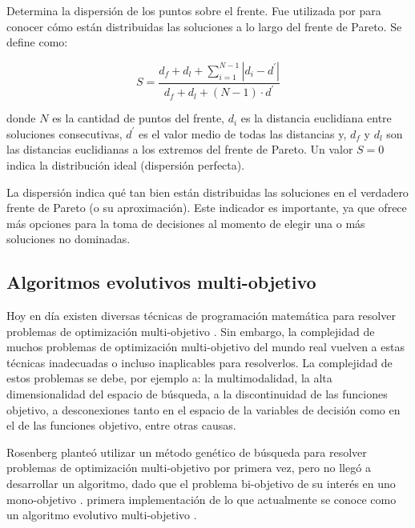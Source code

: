       \DIFdelbegin %
\DIFdelend \DIFaddbegin \begin{definicion}
	 \DIFaddend Determina la dispersi\'on de los puntos sobre el frente. Fue utilizada por \cite{deb02} para conocer 
	 c\'omo est\'an distribuidas las soluciones a lo largo del frente de Pareto. Se define como:

	 \[S= \frac{d_f + d_l + \sum^{N-1}_{i=1}{|d_i-d^{'}|}}{d_f + d_l + \left(N -1\right)\cdot d^{'}}\]

      donde $N$ es la cantidad de puntos del frente, $d_i$ es la distancia euclidiana entre soluciones consecutivas, 
      $d^{'}$ es el valor medio de todas las distancias y, $d_f$ y $d_l$ son las distancias euclidianas a los extremos 
      del frente de Pareto. Un valor $S = 0$ indica la distribuci\'on ideal (dispersi\'on perfecta).
      \end{definicion}   

      La dispersi\'on indica qu\'e tan bien est\'an distribuidas las soluciones en el verdadero frente de Pareto (o su aproximaci\'on).
      Este indicador es importante, ya que ofrece m\'as opciones para la toma de decisiones al momento de elegir una o m\'as soluciones 
      no dominadas.

  \subsection{Algoritmos evolutivos multi-objetivo}

  Hoy en d\'ia existen diversas t\'ecnicas de programaci\'on matem\'atica para resolver problemas de optimizaci\'on multi-objetivo 
  \cite{Miettinen98, EASMC85}. Sin embargo, la complejidad de muchos problemas de optimizaci\'on multi-objetivo del mundo real vuelven 
  a estas t\'ecnicas inadecuadas o incluso inaplicables para resolverlos. La complejidad de estos problemas se debe, por ejemplo a: 
  la multimodalidad, la alta dimensionalidad del espacio de b\'usqueda, a la discontinuidad de las funciones objetivo, a desconexiones 
  tanto en el espacio de la variables de decisi\'on como en el de las funciones objetivo, entre otras causas.

  Rosenberg plante\'o utilizar un m\'etodo gen\'etico de b\'usqueda para resolver problemas de optimizaci\'on
  multi-objetivo por primera vez, pero no lleg\'o a desarrollar un algoritmo, dado que \DIFdelbegin {}\DIFdelend \DIFaddbegin {}\DIFaddend el problema 
  bi-objetivo de su inter\'es en uno mono-objetivo \cite{Rosenberg67}. \DIFdelbegin {}\DIFdelend \DIFaddbegin \cite{Schaffer84} \DIFaddend primera implementaci\'on de lo que 
  actualmente se conoce como un algoritmo evolutivo multi-objetivo\DIFdelbegin {}%
\DIFdelend . 

